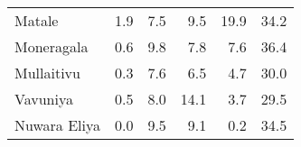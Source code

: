 \begin{tabular}{lrrrrr}
Matale       &         1.9 &         7.5 &          9.5 &             19.9 &        34.2 \\
Moneragala   &         0.6 &         9.8 &          7.8 &              7.6 &        36.4 \\
Mullaitivu   &         0.3 &         7.6 &          6.5 &              4.7 &        30.0 \\
Vavuniya     &         0.5 &         8.0 &         14.1 &              3.7 &        29.5 \\
Nuwara Eliya &         0.0 &         9.5 &          9.1 &              0.2 &        34.5 \\
\bottomrule
\end{tabular}
